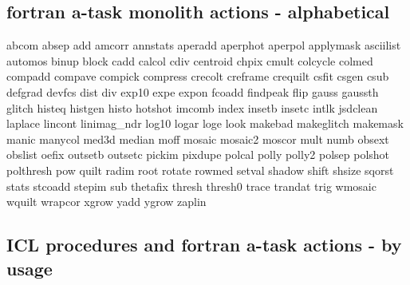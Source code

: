\subsection{fortran a-task monolith actions - alphabetical}

abcom absep add amcorr annstats aperadd aperphot aperpol applymask
asciilist automos binup block cadd calcol cdiv centroid chpix cmult
colcycle colmed compadd compave compick compress crecolt creframe
crequilt csfit csgen csub defgrad devfcs dist div exp10 expe expon fcoadd
findpeak flip gauss gaussth glitch histeq histgen histo hotshot imcomb
index insetb insetc intlk jsdclean laplace lincont linimag\_ndr log10
logar loge look makebad makeglitch makemask manic manycol med3d median
moff mosaic mosaic2 moscor mult numb obsext obslist oefix outsetb outsetc
pickim pixdupe polcal polly polly2 polsep polshot polthresh pow quilt
radim root rotate rowmed setval shadow shift shsize sqorst stats stcoadd
stepim sub thetafix thresh thresh0 trace trandat trig wmosaic wquilt
wrapcor xgrow yadd ygrow zaplin

\subsection{ICL procedures and fortran a-task actions - by usage}


